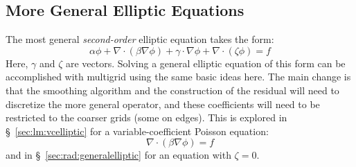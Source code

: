 \subsection{More General Elliptic Equations}

The most general {\em second-order} elliptic equation takes the form:
\begin{equation}
  \alpha \phi + \nabla \cdot (\beta \nabla \phi) +
  \gamma \cdot \nabla \phi + \nabla \cdot (\zeta \phi) = f
\end{equation}
Here, $\gamma$ and $\zeta$ are vectors.  Solving a general elliptic
equation of this form can be accomplished with multigrid using the
same basic ideas here.  The main change is that the smoothing
algorithm and the construction of the residual will need to discretize
the more general operator, and these coefficients will need to
be restricted to the coarser grids (some on edges).  This is explored in
\S~\ref{sec:lm:vcelliptic} for a variable-coefficient Poisson equation:
 \begin{equation}
 \nabla \cdot (\beta \nabla \phi) = f
 \end{equation}
\ifdefined\debugmode
and in \S~\ref{sec:rad:generalelliptic} for an equation with $\zeta = 0$.
\fi
